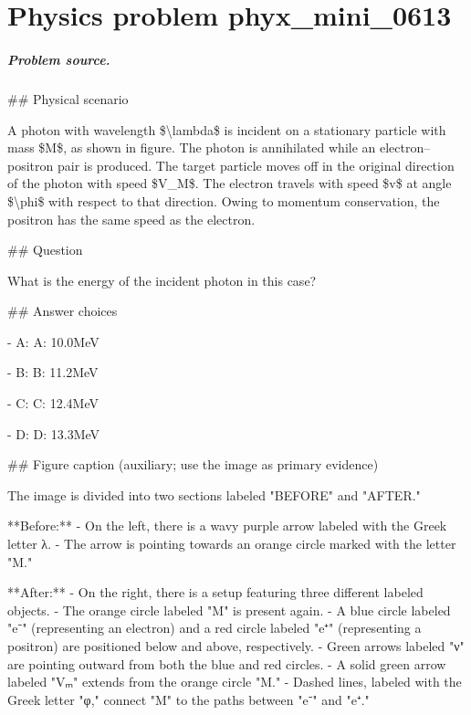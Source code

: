 
\chapter{Physics problem phyx\_mini\_0613}
\label{ch:PhyXMiniProblems_problem_phyx_mini_0613}

\paragraph{Problem source.}
\#\# Physical scenario

A photon with wavelength \$\textbackslash{}lambda\$ is incident on a stationary particle with mass \$M\$, as shown in figure. The photon is annihilated while an electron–positron pair is produced. The target particle moves off in the original direction of the photon with speed \$V\_M\$. The electron travels with speed \$v\$ at angle \$\textbackslash{}phi\$ with respect to that direction. Owing to momentum conservation, the positron has the same speed as the electron.

\#\# Question

What is the energy of the incident photon in this case?

\#\# Answer choices

- A: A:  10.0MeV

- B: B:  11.2MeV

- C: C:  12.4MeV

- D: D:  13.3MeV

\#\# Figure caption (auxiliary; use the image as primary evidence)

The image is divided into two sections labeled "BEFORE" and "AFTER."

**Before:**
- On the left, there is a wavy purple arrow labeled with the Greek letter λ.
- The arrow is pointing towards an orange circle marked with the letter "M."

**After:**
- On the right, there is a setup featuring three different labeled objects.
- The orange circle labeled "M" is present again.
- A blue circle labeled "e⁻" (representing an electron) and a red circle labeled "e⁺" (representing a positron) are positioned below and above, respectively.
- Green arrows labeled "ν" are pointing outward from both the blue and red circles.
- A solid green arrow labeled "Vₘ" extends from the orange circle "M."
- Dashed lines, labeled with the Greek letter "φ," connect "M" to the paths between "e⁻" and "e⁺."

